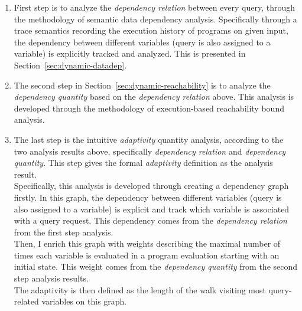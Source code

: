 \begin{enumerate}
   \item First step is to analyze the \emph{dependency relation} between every query, 
   through the methodology of semantic data dependency analysis.
   Specifically through a trace semantics recording the execution history of programs on given input,
   the dependency between different variables (query is also assigned to a variable) is explicitly tracked and 
   analyzed. This is presented in Section~\ref{sec:dynamic-datadep}.
   \item The second step in Section~\ref{sec:dynamic-reachability} is to analyze the \emph{dependency quantity} 
  based on the \emph{dependency relation} above.
  This analysis is developed through the methodology of execution-based reachability bound analysis.
   \item The last step is the intuitive \emph{adaptivity} quantity analysis, 
   according to the two analysis results above, specifically \emph{dependency relation} and \emph{dependency quantity}.
   This step 
  gives the formal \emph{adaptivity} definition as the analysis result. 
  \\
  Specifically, this analysis is developed through creating a dependency graph firstly. 
  In this graph, the dependency between different variables (query is also assigned to a variable) 
  is explicit and track which variable is associated with a query request. 
  This dependency comes from the \emph{dependency relation} from the first step analysis.
  \\
 Then, I enrich this graph with 
 weights describing the maximal number of times each variable is evaluated in a program evaluation starting with an initial state. 
 This weight comes from the \emph{dependency quantity} from the second step analysis results.
 \\
  The adaptivity is then defined as the length of the walk visiting most query-related variables on this graph. 
      \end{enumerate}
